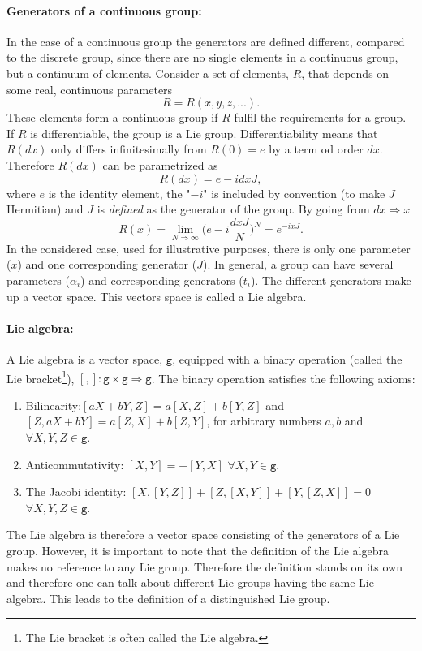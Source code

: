 \paragraph{Generators of a continuous group: }
In the case of a continuous group the generators are defined different, compared to the discrete group, since there are no single elements in a continuous group, but a continuum of elements. Consider a set of elements, $R$, that depends on some real, continuous parameters
\begin{equation}
	R=R(x,y,z,...).
\end{equation} 
These elements form a continuous group if $R$ fulfil the requirements for a group. If $R$ is differentiable, the group is a Lie group. Differentiability means that $R(dx)$ only differs infinitesimally from $R(0)=e$ by a term od order $dx$. Therefore $R(dx)$ can be parametrized as
\begin{equation}
	R(dx)=e-idxJ,
	\label{dj}
\end{equation} 
where $e$ is the identity element, the "$-i$" is included by convention (to make $J$ Hermitian) and $J$ is \emph{defined} as the generator of the group. By going from $dx\Rightarrow x$
\begin{equation}
	R(x)=\lim\limits_{N\Rightarrow \infty}\bigg(e-i\frac{dxJ}{N}\bigg)^N=e^{-ixJ}.
	\label{eq8}
\end{equation} 
In the considered case, used for illustrative purposes, there is only one parameter ($x$) and one corresponding generator ($J$). In general, a group can have several parameters ($\alpha_i$) and corresponding generators ($t_i$). The different generators make up a vector space. This vectors space is called a Lie algebra. 
\paragraph{Lie algebra:} A Lie algebra is a vector space, $\texttt{g}$, equipped with a binary operation (called the Lie bracket\footnote{The Lie bracket is often called the Lie algebra.}), $[,]: \texttt{g}\times \texttt{g}\Rightarrow \texttt{g}$. The binary operation satisfies the following axioms:
\begin{enumerate}
	\item Bilinearity:$[aX+bY,Z]=a[X,Z]+b[Y,Z]$ and $[Z,aX+bY]=a[Z,X]+b[Z,Y]$, for arbitrary numbers $a,b$ and $\forall X,Y,Z\in \texttt{g}$.
	
	\item Anticommutativity: $[X,Y]=-[Y,X]$ $\forall X,Y\in \texttt{g}$.
	
	\item The Jacobi identity: $[X,[Y,Z]]+[Z,[X,Y]]+[Y,[Z,X]]=0$ $\forall X,Y,Z \in \texttt{g}$. 
\end{enumerate}
The Lie algebra is therefore a vector space consisting of the generators of a Lie group. However, it is important to note that the definition of the Lie algebra makes no reference to any Lie group. Therefore the definition stands on its own and therefore one can talk about different Lie groups having the same Lie algebra. This leads to the definition of a distinguished Lie group.
